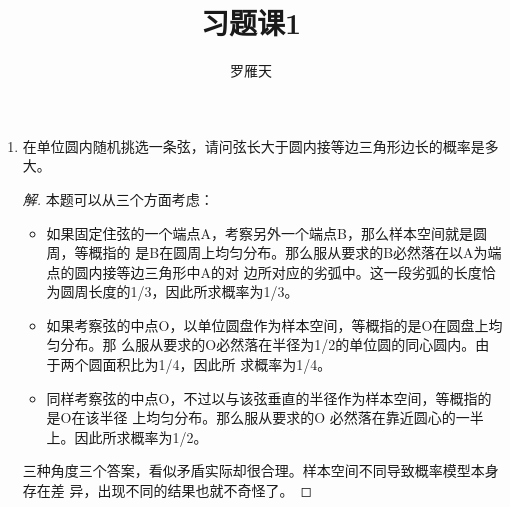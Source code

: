 \documentclass[12pt]{article}
\newcommand{\hei}{\CJKfamily{hei}}                          %
\begin{document}
\author{罗雁天}
\title{习题课1}
\maketitle

\medskip

\begin{enumerate}

\item {\hei 在单位圆内随机挑选一条弦，请问弦长大于圆内接等边三角形边长的概率是多大。}
\begin{proof}[解]
	本题可以从三个方面考虑：
	\begin{itemize}
		\item 如果固定住弦的一个端点A，考察另外一个端点B，那么样本空间就是圆周，等概指的 是B在圆周上均匀分布。那么服从要求的B必然落在以A为端点的圆内接等边三角形中A的对 边所对应的劣弧中。这一段劣弧的长度恰为圆周长度的1/3，因此所求概率为1/3。
		\item 如果考察弦的中点O，以单位圆盘作为样本空间，等概指的是O在圆盘上均匀分布。那 么服从要求的O必然落在半径为1/2的单位圆的同心圆内。由于两个圆面积比为1/4，因此所 求概率为1/4。
		\item 同样考察弦的中点O，不过以与该弦垂直的半径作为样本空间，等概指的是O在该半径 上均匀分布。那么服从要求的O 必然落在靠近圆心的一半上。因此所求概率为1/2。
	\end{itemize}
	三种角度三个答案，看似矛盾实际却很合理。样本空间不同导致概率模型本身存在差 异，出现不同的结果也就不奇怪了。
\end{proof}


\end{enumerate}
\end{document}
